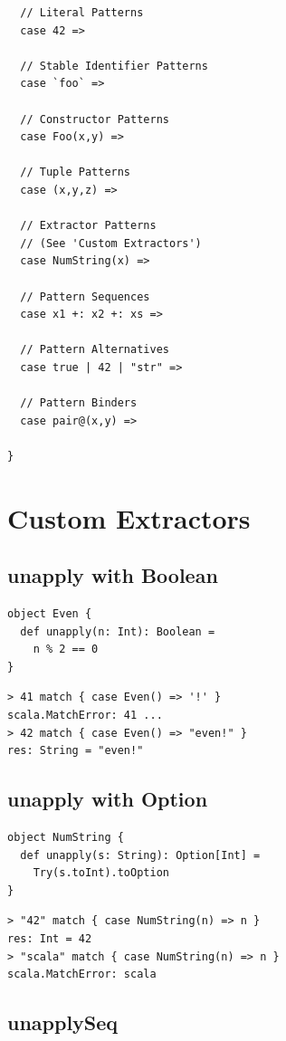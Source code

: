 \documentclass[10pt,landscape,a4paper]{article}
\begin{document}
\begin{multicols*}{4}
\begin{verbatim}
  // Literal Patterns
  case 42 =>

  // Stable Identifier Patterns
  case `foo` =>

  // Constructor Patterns
  case Foo(x,y) =>

  // Tuple Patterns
  case (x,y,z) =>

  // Extractor Patterns
  // (See 'Custom Extractors')
  case NumString(x) =>

  // Pattern Sequences
  case x1 +: x2 +: xs =>

  // Pattern Alternatives
  case true | 42 | "str" =>

  // Pattern Binders
  case pair@(x,y) =>

}
\end{verbatim}

\section{Custom Extractors}

\subsection{unapply with Boolean}

\begin{verbatim}
object Even {
  def unapply(n: Int): Boolean =
    n % 2 == 0
}
\end{verbatim}

\begin{verbatim}
> 41 match { case Even() => '!' }
scala.MatchError: 41 ...
> 42 match { case Even() => "even!" }
res: String = "even!"
\end{verbatim}

\subsection{unapply with Option}

\begin{verbatim}
object NumString {
  def unapply(s: String): Option[Int] =
    Try(s.toInt).toOption
}
\end{verbatim}

\begin{verbatim}
> "42" match { case NumString(n) => n }
res: Int = 42
> "scala" match { case NumString(n) => n }
scala.MatchError: scala
\end{verbatim}

\subsection{unapplySeq}


\end{multicols*}
\end{document}
